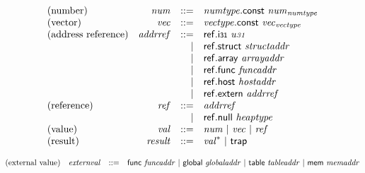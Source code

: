 \vspace{1ex}

\vspace{1ex}

$$
\begin{array}{@{}lrrl@{}l@{}}
\mbox{(number)} & {\mathit{num}} &::=& {\mathit{numtype}}.\mathsf{const}~{{\mathit{num}}}_{{\mathit{numtype}}} \\
\mbox{(vector)} & {\mathit{vec}} &::=& {\mathit{vectype}}.\mathsf{const}~{{\mathit{vec}}}_{{\mathit{vectype}}} \\
\mbox{(address reference)} & {\mathit{addrref}} &::=& \mathsf{ref.i{\scriptstyle31}}~{\mathit{u{\scriptstyle31}}} \\ &&|&
\mathsf{ref.struct}~{\mathit{structaddr}} \\ &&|&
\mathsf{ref.array}~{\mathit{arrayaddr}} \\ &&|&
\mathsf{ref.func}~{\mathit{funcaddr}} \\ &&|&
\mathsf{ref.host}~{\mathit{hostaddr}} \\ &&|&
\mathsf{ref.extern}~{\mathit{addrref}} \\
\mbox{(reference)} & {\mathit{ref}} &::=& {\mathit{addrref}} \\ &&|&
\mathsf{ref.null}~{\mathit{heaptype}} \\
\mbox{(value)} & {\mathit{val}} &::=& {\mathit{num}} ~|~ {\mathit{vec}} ~|~ {\mathit{ref}} \\
\mbox{(result)} & {\mathit{result}} &::=& {{\mathit{val}}^\ast} ~|~ \mathsf{trap} \\
\end{array}
$$

\vspace{1ex}

$$
\begin{array}{@{}lrrl@{}l@{}}
\mbox{(external value)} & {\mathit{externval}} &::=& \mathsf{func}~{\mathit{funcaddr}} ~|~ \mathsf{global}~{\mathit{globaladdr}} ~|~ \mathsf{table}~{\mathit{tableaddr}} ~|~ \mathsf{mem}~{\mathit{memaddr}} \\
\end{array}
$$

\vspace{1ex}

\vspace{1ex}

